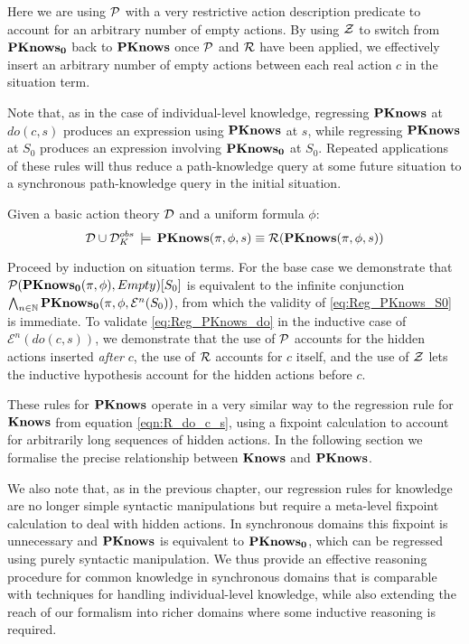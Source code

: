 Here we are using $\mathcal{P}$ with a very restrictive action description
predicate to account for an arbitrary number of empty actions. By
using $\mathcal{Z}$ to switch from $\mathbf{PKnows_{0}}$ back to $\mathbf{PKnows}$ once $\mathcal{P}$
and $\mathcal{R}$ have been applied, we effectively insert an arbitrary
number of empty actions between each real action $c$ in the situation
term.

Note that, as in the case of individual-level knowledge, regressing
$\mathbf{PKnows}$ at $do(c,s)$ produces an expression using $\mathbf{PKnows}$ at
$s$, while regressing $\mathbf{PKnows}$ at $S_{0}$ produces an expression
involving $\mathbf{PKnows_{0}}$ at $S_{0}$. Repeated applications of these
rules will thus reduce a path-knowledge query at some future situation
to a synchronous path-knowledge query in the initial situation.

\begin{thm}
\label{thm:Reg_PKnows}Given a basic action theory $\mathcal{D}$ and a uniform
formula $\phi$:\[
\mathcal{D}\cup\mathcal{D}_{K}^{obs}\,\models\,\mathbf{PKnows}(\pi,\phi,s)\equiv\mathcal{R}(\mathbf{PKnows}(\pi,\phi,s))\]

\end{thm}
\begin{proofsketch}
Proceed by induction on situation terms. For the base case we demonstrate
that $\mathcal{P}(\mathbf{PKnows_{0}}(\pi,\phi),Empty)[S_{0}]$ is equivalent to the
infinite conjunction $\bigwedge_{n\in\mathbb{N}}\mathbf{PKnows_{0}}(\pi,\phi,\mathcal{E}^{n}(S_{0}))$,
from which the validity of \eqref{eq:Reg_PKnows_S0} is immediate.
To validate \eqref{eq:Reg_PKnows_do} in the inductive case of $\mathcal{E}^{n}(do(c,s))$,
we demonstrate that the use of $\mathcal{P}$ accounts for the hidden actions
inserted \emph{after} $c$, the use of $\mathcal{R}$ accounts for $c$ itself,
and the use of $\mathcal{Z}$ lets the inductive hypothesis account for the
hidden actions before $c$. 
\end{proofsketch}
These rules for $\mathbf{PKnows}$ operate in a very similar way to the regression
rule for $\mathbf{Knows}$ from equation \eqref{eqn:R_do_c_s}, using a fixpoint
calculation to account for arbitrarily long sequences of hidden actions.
In the following section we formalise the precise relationship between
$\mathbf{Knows}$ and $\mathbf{PKnows}$.

We also note that, as in the previous chapter, our regression rules
for knowledge are no longer simple syntactic manipulations but require
a meta-level fixpoint calculation to deal with hidden actions. In
synchronous domains this fixpoint is unnecessary and $\mathbf{PKnows}$ is
equivalent to $\mathbf{PKnows_{0}}$, which can be regressed using purely syntactic
manipulation. We thus provide an effective reasoning procedure for
common knowledge in synchronous domains that is comparable with techniques
for handling individual-level knowledge, while also extending the
reach of our formalism into richer domains where some inductive reasoning
is required.

